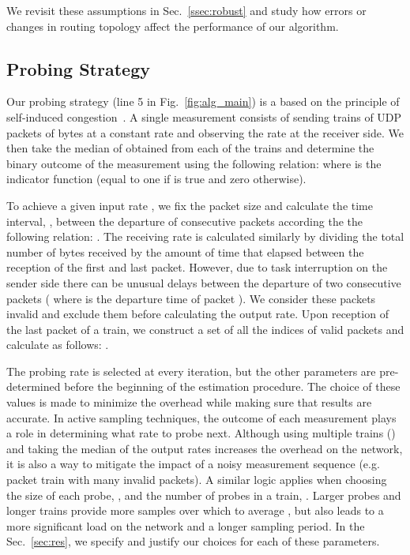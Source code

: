 \documentclass[final,5p,times,twocolumn]{elsarticle}
\begin{document}
We revisit these assumptions in Sec.~\ref{ssec:robust} and study how errors or changes in routing topology affect the performance of our algorithm.			
	
\subsection{Probing Strategy}

Our probing strategy (line 5 in Fig.~\ref{fig:alg_main}) is a based on the principle of self-induced congestion~\cite{rib:03}.  A single measurement consists of sending  trains of  UDP packets of  bytes at a constant rate  and observing the rate  at the receiver side.  We then take the median of  obtained from each of the  trains and determine the binary outcome  of the measurement using the following relation:  where  is the indicator function (equal to one if  is true and zero otherwise).  

To achieve a given input rate , we fix the packet size and calculate the time interval, , between the departure of consecutive packets according the the following relation: .  The receiving rate is calculated similarly by dividing the total number of bytes received by the amount of time that elapsed between the reception of the first and last packet. However, due to task interruption on the sender side there can be unusual delays between the departure of two consecutive packets ( where  is the departure time of packet ).  We consider these packets invalid and exclude them before calculating the output rate.  Upon reception of the last packet of a train, we construct a set  of all the indices  of valid packets and calculate  as follows: .

The probing rate is selected at every iteration, but the other parameters are pre-determined before the beginning of the estimation procedure.  The choice of these values is made to minimize the overhead while making sure that results are accurate.  In active sampling techniques, the outcome of each measurement plays a role in determining what rate to probe next.  Although using multiple trains () and taking the median of the output rates increases the overhead on the network, it is also a way to mitigate the impact of a  noisy measurement sequence (e.g. packet train with many invalid packets).  A similar logic applies when choosing the size of each probe, , and the number of probes in a train, .  Larger probes and longer trains provide more samples over which to average , but also leads to a more significant load on the network and a longer sampling period.  In the Sec.~\ref{sec:res}, we specify and justify our choices for each of these parameters.
\end{document}
